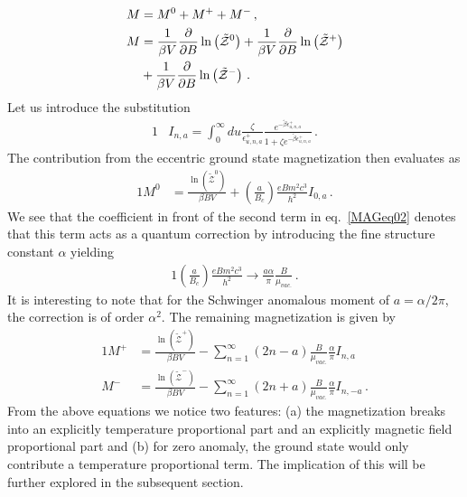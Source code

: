 \documentclass[
aps,
pra,
twocolumn,
showpacs,
preprintnumbers,
amsmath,
amssymb,
footinbib
]{revtex4-2}
\begin{document}
\begin{alignat}{1}
  \notag M&=M^{0}+M^{+}+M^{-}\,,\\
  \notag M&=\frac{1}{\beta V}\frac{\partial}{\partial B}\ln\left(\tilde{\mathcal{Z}}^{0}\right)+\frac{1}{\beta V}\frac{\partial}{\partial B}\ln\left(\tilde{\mathcal{Z}}^{+}\right)\\
  \label{MAGeq01}&+\frac{1}{\beta V}\frac{\partial}{\partial B}\ln\left(\tilde{\mathcal{Z}}^{-}\right)\,.
\end{alignat}
Let us introduce the substitution
\begin{alignat}{1}
  \label{MAGeq02} &I_{n,a}=\int_{0}^{\infty}du\frac{\zeta}{\epsilon_{u,n,a}^{+}}\frac{e^{-\tilde{\beta}\epsilon_{u,n,a}^{+}}}{1+\zeta e^{-\tilde{\beta}\epsilon_{u,n,a}^{+}}}\,.
\end{alignat}
The contribution from the eccentric ground state magnetization then evaluates as
\begin{alignat}{1}
  \label{MAGeq03} M^{0}&=\frac{\ln\left(\tilde{\mathcal{Z}}^{0}\right)}{\beta BV}+\left(\frac{a}{B_{c}}\right)\frac{eBm^{2}c^{3}}{h^{2}}I_{0,a}\,.
\end{alignat}
We see that the coefficient in front of the second term in eq.~\eqref{MAGeq02} denotes that this term acts as a quantum correction by introducing the fine structure constant $\alpha$ yielding
\begin{alignat}{1}
  \label{MAGeq04} \left(\frac{a}{B_{c}}\right)\frac{eBm^{2}c^{3}}{h^{2}}\rightarrow \frac{a\alpha}{\pi}\frac{B}{\mu_{vac.}}\,.
\end{alignat}
It is interesting to note that for the Schwinger anomalous moment of $a=\alpha/2\pi$, the correction is of order $\alpha^{2}$.
The remaining magnetization is given by
\begin{alignat}{1}
  \label{MAGeq05} M^{+}&=\frac{\ln\left(\tilde{\mathcal{Z}}^{+}\right)}{\beta BV}-\sum_{n=1}^{\infty}\left(2n-a\right)\frac{B}{\mu_{vac.}}\frac{\alpha}{\pi}I_{n,a}\\
  \label{MAGeq06} M^{-}&=\frac{\ln\left(\tilde{\mathcal{Z}}^{-}\right)}{\beta BV}-\sum_{n=1}^{\infty}\left(2n+a\right)\frac{B}{\mu_{vac.}}\frac{\alpha}{\pi}I_{n,-a}\,.
\end{alignat}
From the above equations we notice two features: (a) the magnetization breaks into an explicitly temperature proportional part and an explicitly magnetic field proportional part and (b) for zero anomaly, the ground state would only contribute a temperature proportional term. The implication of this will be further explored in the subsequent section.
\end{document}
